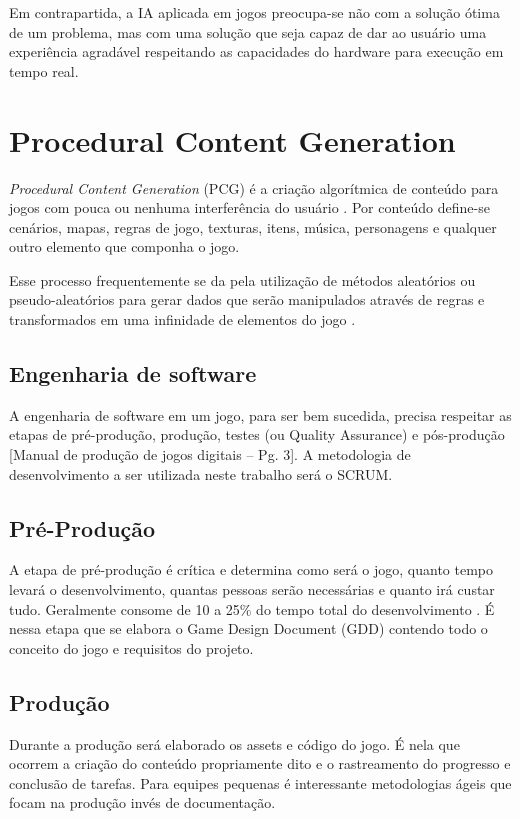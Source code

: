\documentclass[12pt, 
openright, 
oneside, 
a4paper,    
brazil]{facom-ufu-abntex2}
\begin{document}
Em contrapartida, a IA aplicada em jogos preocupa-se não com a solução ótima de um problema, mas com uma solução que seja capaz de dar ao usuário uma experiência agradável respeitando as capacidades do hardware para execução em tempo real.
\section{Procedural Content Generation}
\textit{Procedural Content Generation} (PCG) é a criação algorítmica de conteúdo para jogos com pouca ou nenhuma interferência do usuário \cite{ProceduralContentGenerationInGames}. Por conteúdo define-se cenários, mapas, regras de jogo, texturas, itens, música, personagens e qualquer outro elemento que componha o jogo.

Esse processo frequentemente se da pela utilização de métodos aleatórios ou pseudo-aleatórios para gerar dados que serão manipulados através de regras e transformados em uma infinidade de elementos do jogo \cite{PCGWiki}.

\iffalse
\subsection{Engenharia de software}
A engenharia de software em um jogo, para ser bem sucedida, precisa respeitar as etapas de pré-produção, produção, testes (ou Quality Assurance) e pós-produção [Manual de produção de jogos digitais – Pg. 3]. A metodologia de desenvolvimento a ser utilizada neste trabalho será o SCRUM.

\subsection{Pré-Produção}
A etapa de pré-produção é crítica e determina como será o jogo, quanto tempo levará o desenvolvimento, quantas pessoas serão necessárias e quanto irá custar tudo. Geralmente consome de 10 a 25\% do tempo total do desenvolvimento \cite{Manualdejogosdigitais}. É nessa etapa que se elabora o Game Design Document (GDD) contendo todo o conceito do jogo e requisitos do projeto.

\subsection{Produção}
Durante a produção será elaborado os assets e código do jogo. É nela que ocorrem a criação do conteúdo propriamente dito e o rastreamento do progresso e conclusão de tarefas\cite{Manualdejogosdigitais}. Para equipes pequenas é interessante metodologias ágeis que focam na produção invés de documentação.
\end{document}
